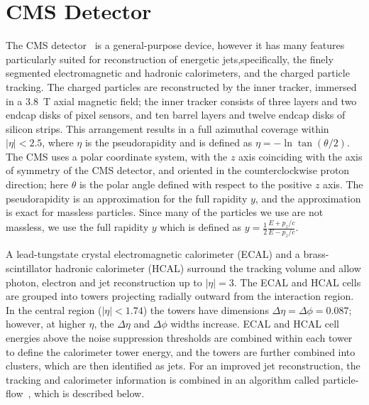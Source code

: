 
\ifnpas
\section{CMS Detector}
\fi


\label{sec:cms_detector}


The CMS detector~\cite{:2008zzk}
is a general-purpose device, however it has
many features particularly suited for reconstruction of 
energetic jets,specifically, the finely segmented electromagnetic
and hadronic calorimeters, and the charged particle tracking.
The charged particles are reconstructed by the inner tracker,
immersed in a $3.8$~T axial magnetic field; the inner tracker consists
of three layers and two endcap disks of pixel sensors, and ten
barrel layers and twelve endcap disks of silicon strips.  This
arrangement results
in a full azimuthal coverage within $|\eta| < 2.5$, where $\eta$
is the pseudorapidity and is defined as $\eta = -\ln\tan(\theta/2)$.
The CMS uses a polar coordinate system, with the 
$z$ axis coinciding with the axis of symmetry of the CMS detector,
and oriented in the counterclockwise proton direction; here $\theta$ 
is the polar angle defined with respect to the positive $z$ axis.
The pseudorapidity is an approximation for the full rapidity $y$, and
the approximation is exact for massless particles. Since many of the
particles we use are not massless, we use the full rapidity $y$ which
is defined as $y = \frac{1}{2} \frac {E + p_{z}/c}{E - p_{z}/c}$.

A lead-tungstate crystal electromagnetic calorimeter (ECAL) and 
a brass-scintillator hadronic calorimeter (HCAL) surround the tracking
volume and allow photon, electron and jet reconstruction up to $|\eta|=3$.
The ECAL and HCAL cells are grouped into towers projecting radially 
outward from the interaction region.  In the central region ($|\eta|<1.74$)
the towers have dimensions $\Delta\eta = \Delta\phi = 0.087$; however,
at higher $\eta$, the $\Delta\eta$ and $\Delta\phi$ widths increase.  
ECAL and HCAL
cell energies above the noise suppression thresholds are combined within
each tower to define the calorimeter tower energy, and the towers are further
combined into clusters, which are then identified as jets.  For an improved
jet reconstruction, the tracking and calorimeter information is combined 
in an algorithm called particle-flow~\cite{particleflow}, which is described
below.

